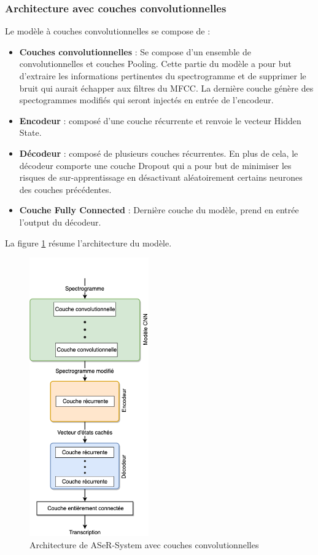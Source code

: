 \subsubsection{Architecture avec couches convolutionnelles}
Le modèle à couches convolutionnelles se compose de :
\begin{itemize}
    \item \textbf{Couches convolutionnelles} : Se compose d'un ensemble de convolutionnelles et couches Pooling. Cette partie du modèle a pour but d'extraire les informations pertinentes du spectrogramme et de supprimer le bruit qui aurait échapper aux filtres du MFCC. La dernière couche génère des spectogrammes modifiés qui seront injectés en entrée de l'encodeur.
    \item \textbf{Encodeur} : composé d'une couche récurrente et renvoie le vecteur Hidden State.
    \item \textbf{Décodeur} : composé de plusieurs couches récurrentes. En plus de cela, le décodeur comporte une couche Dropout qui a pour but de minimiser les risques de sur-apprentissage en désactivant aléatoirement certains neurones des couches précédentes.
    \item \textbf{Couche Fully Connected} : Dernière couche du modèle, prend en entrée l'output du décodeur. \\
\end{itemize}

La figure \ref{arch_cnn} résume l'architecture du modèle.
\begin{figure}[H]
    \centering
    \includegraphics[height=340pt]{images/chap3/CNN_model.png}
    \caption{Architecture de ASeR-System avec couches convolutionnelles}
    \label{arch_cnn}
\end{figure}

